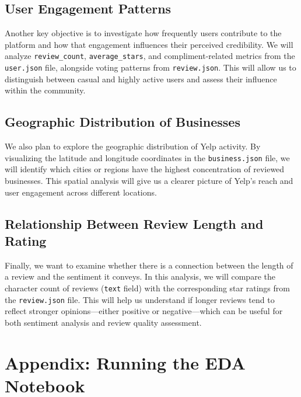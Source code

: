 \documentclass[conference]{IEEEtran}
\begin{document}
\subsection{User Engagement Patterns}

Another key objective is to investigate how frequently users contribute to the
platform and how that engagement influences their perceived credibility. We will
analyze \texttt{review\_count}, \texttt{average\_stars}, and compliment-related
metrics from the \texttt{user.json} file, alongside voting patterns from
\texttt{review.json}. This will allow us to distinguish between casual and highly
active users and assess their influence within the community.

\subsection{Geographic Distribution of Businesses}

We also plan to explore the geographic distribution of Yelp activity. By visualizing
the latitude and longitude coordinates in the \texttt{business.json} file, we
will identify which cities or regions have the highest concentration of reviewed
businesses. This spatial analysis will give us a clearer picture of Yelp's reach
and user engagement across different locations.

\subsection{Relationship Between Review Length and Rating}

Finally, we want to examine whether there is a connection between the length of
a review and the sentiment it conveys. In this analysis, we will compare the
character count of reviews (\texttt{text} field) with the corresponding star
ratings from the \texttt{review.json} file. This will help us understand if longer
reviews tend to reflect stronger opinions—either positive or negative—which can
be useful for both sentiment analysis and review quality assessment.

\section*{Appendix: Running the EDA Notebook}\label{app:1}
\end{document}
